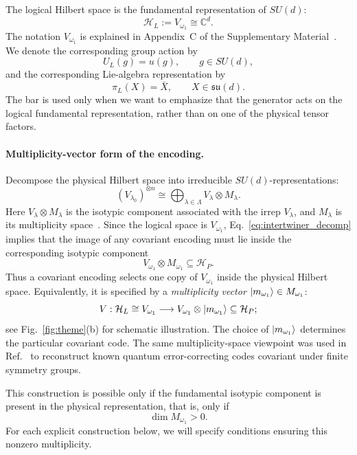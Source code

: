 \documentclass[10pt,twocolumn,superscriptaddress,aps,amsmath,amssymb,citeautoscript,floatfix,prx]{revtex4-2}
\newcounter{alg}
\theoremstyle{plain}
\theoremstyle{plain}
\theoremstyle{plain}
\theoremstyle{plain}
\theoremstyle{plain}
\theoremstyle{plain}
\begin{document}
The logical Hilbert space is the fundamental representation of $SU(d)$:
\begin{equation}\label{eq:log_space_rep}
\mathcal H_L
:=
V_{\omega_1}
\cong
\mathbb C^d .
\end{equation}
The notation $V_{\omega_1}$ is explained in Appendix~C of the Supplementary Material~\cite{SuppMat}. We denote the corresponding group action by
$$
U_L(g)
=
u(g),
\qquad
g\in SU(d),
$$
and the corresponding Lie-algebra representation by
$$
\pi_L(X)
=
\bar X,
\qquad
X\in\mathfrak{su}(d).
$$
The bar is used only when we want to emphasize that the generator acts on the logical fundamental representation, rather than on one of the physical tensor factors.

\paragraph{Multiplicity-vector form of the encoding.}

Decompose the physical Hilbert space into irreducible $SU(d)$-representations:
\begin{equation}\label{eq:isotipic_decomp}
(V_{\lambda_0})^{\otimes n}
\cong
\bigoplus_{\lambda\in\Lambda}
V_\lambda\otimes M_\lambda .
\end{equation}
Here $V_\lambda\otimes M_\lambda$ is the isotypic component associated with the irrep $V_\lambda$, and $M_\lambda$ is its multiplicity space~\cite{Kong2022}. Since the logical space is $V_{\omega_1}$, Eq.~\eqref{eq:intertwiner_decomp} implies that the image of any covariant encoding must lie inside the corresponding isotypic component
$$
V_{\omega_1}\otimes M_{\omega_1}
\subseteq
\mathcal H_P .
$$
Thus a covariant encoding selects one copy of $V_{\omega_1}$ inside the physical Hilbert space. Equivalently, it is specified by a \textit{multiplicity vector} $\ket{m_{\omega_1}}\in M_{\omega_1}$:
\begin{equation}\label{eq:mult_vec_enc}
V:
\mathcal H_L
\cong
V_{\omega_1}
\longrightarrow
V_{\omega_1}\otimes\ket{m_{\omega_1}}
\subseteq
\mathcal H_P;
\end{equation}
see Fig.~\ref{fig:theme}(b) for schematic illustration. The choice of $\ket{m_{\omega_1}}$ determines the particular covariant code. The same multiplicity-space viewpoint was used in Ref.~\cite{Denys2024} to reconstruct known quantum error-correcting codes covariant under finite symmetry groups.

This construction is possible only if the fundamental isotypic component is present in the physical representation, that is, only if
$$
\dim M_{\omega_1}>0 .
$$
For each explicit construction below, we will specify conditions ensuring this nonzero multiplicity.
\end{document}
